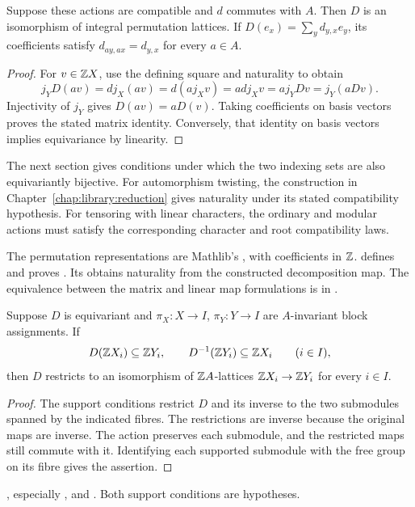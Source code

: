 \begin{proposition}
\label{lib:actions:basic-set}
Suppose these actions are compatible and $d$ commutes with $A$. Then $D$
is an isomorphism of integral permutation lattices. If
$D(e_x)=\sum_y d_{y,x}e_y$, its coefficients satisfy
$d_{ay,ax}=d_{y,x}$ for every $a\in A$.
\end{proposition}
\begin{proof}
For $v\in\mathbb Z X$, use the defining square and naturality to obtain
\[
 j_Y D(av)=d j_X(av)=d(a j_Xv)
          =a d j_Xv=a j_Y Dv=j_Y(a Dv).
\]
Injectivity of $j_Y$ gives $D(av)=aD(v)$. Taking coefficients on basis
vectors proves the stated matrix identity. Conversely, that identity on
basis vectors implies equivariance by linearity.
\end{proof}

The next section
gives conditions under which the two indexing sets are also
equivariantly bijective. For automorphism twisting, the construction in
Chapter~\ref{chap:library:reduction} gives naturality under its stated
compatibility hypothesis. For tensoring with linear characters, the ordinary and modular actions
must satisfy the corresponding character and root compatibility laws.
\begin{implementation}
The permutation representations are Mathlib's
, with coefficients in $\mathbb Z$.
 defines
 and proves
. Its
 obtains naturality from the
constructed decomposition map. The equivalence between the matrix and
linear map formulations is
in .
\end{implementation}

\begin{proposition}
\label{lib:actions:block-restriction}
Suppose $D$ is equivariant and $\pi_X:X\to I$, $\pi_Y:Y\to I$ are
$A$-invariant block assignments. If
\[
 D(\mathbb Z X_i)\subseteq\mathbb Z Y_i,
 \qquad D^{-1}(\mathbb Z Y_i)\subseteq\mathbb Z X_i
 \qquad(i\in I),
\]
then $D$ restricts to an isomorphism of $\mathbb Z A$-lattices
$\mathbb Z X_i\to\mathbb Z Y_i$ for every $i\in I$.
\end{proposition}
\begin{proof}
The support conditions restrict $D$ and its inverse to the two submodules
spanned by the indicated fibres. The restrictions are inverse because the
original maps are inverse. The action preserves each submodule, and the
restricted maps still commute with it. Identifying each supported submodule
with the free group on its fibre gives the assertion.
\end{proof}
\begin{implementation}
, especially
, 
and . Both support conditions
are hypotheses.
\end{implementation}

